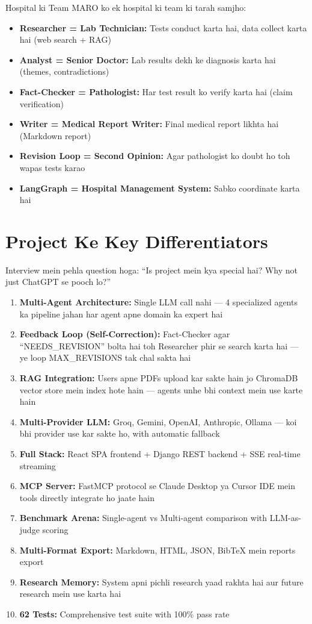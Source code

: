 \documentclass[11pt,a4paper,twoside]{report}
\begin{document}
\begin{analogy}{Hospital ki Team}
MARO ko ek hospital ki team ki tarah samjho:
\begin{itemize}
    \item \textbf{Researcher = Lab Technician:} Tests conduct karta hai, data collect karta hai (web search + RAG)
    \item \textbf{Analyst = Senior Doctor:} Lab results dekh ke diagnosis karta hai (themes, contradictions)
    \item \textbf{Fact-Checker = Pathologist:} Har test result ko verify karta hai (claim verification)
    \item \textbf{Writer = Medical Report Writer:} Final medical report likhta hai (Markdown report)
    \item \textbf{Revision Loop = Second Opinion:} Agar pathologist ko doubt ho toh wapas tests karao
    \item \textbf{LangGraph = Hospital Management System:} Sabko coordinate karta hai
\end{itemize}
\end{analogy}

\section{Project Ke Key Differentiators}

Interview mein pehla question hoga: ``Is project mein kya special hai? Why not just ChatGPT se pooch lo?''

\begin{enumerate}[label=\textbf{\arabic*.}]
    \item \textbf{Multi-Agent Architecture:} Single LLM call nahi --- 4 specialized agents ka pipeline jahan har agent apne domain ka expert hai
    \item \textbf{Feedback Loop (Self-Correction):} Fact-Checker agar ``NEEDS\_REVISION'' bolta hai toh Researcher phir se search karta hai --- ye loop MAX\_REVISIONS tak chal sakta hai
    \item \textbf{RAG Integration:} Users apne PDFs upload kar sakte hain jo ChromaDB vector store mein index hote hain --- agents unhe bhi context mein use karte hain
    \item \textbf{Multi-Provider LLM:} Groq, Gemini, OpenAI, Anthropic, Ollama --- koi bhi provider use kar sakte ho, with automatic fallback
    \item \textbf{Full Stack:} React SPA frontend + Django REST backend + SSE real-time streaming
    \item \textbf{MCP Server:} FastMCP protocol se Claude Desktop ya Cursor IDE mein tools directly integrate ho jaate hain
    \item \textbf{Benchmark Arena:} Single-agent vs Multi-agent comparison with LLM-as-judge scoring
    \item \textbf{Multi-Format Export:} Markdown, HTML, JSON, BibTeX mein reports export
    \item \textbf{Research Memory:} System apni pichli research yaad rakhta hai aur future research mein use karta hai
    \item \textbf{62 Tests:} Comprehensive test suite with 100\% pass rate
\end{enumerate}
\end{document}
